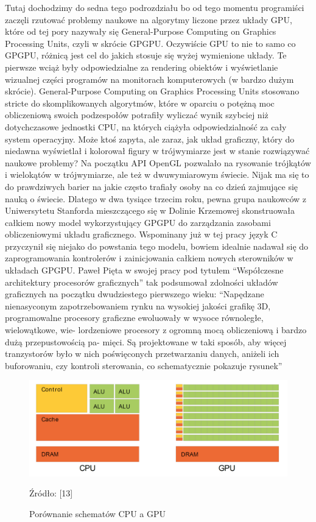 \documentclass{article}
\begin{document}
	\par
	Tutaj dochodzimy do sedna tego podrozdziału bo od tego momentu programiści zaczęli rzutować problemy naukowe na algorytmy liczone przez układy GPU, które od tej pory nazywały się General-Purpose Computing on Graphics Processing Units, czyli w skrócie GPGPU. Oczywiście GPU to nie to samo co GPGPU, różnicą jest cel do jakich stosuje się wyżej wymienione układy. Te pierwsze wciąż były odpowiedzialne za rendering obiektów i wyświetlanie wizualnej części programów na monitorach komputerowych (w bardzo dużym skrócie). General-Purpose Computing on Graphics Processing Units stosowano stricte do skomplikowanych algorytmów, które w oparciu o potężną moc obliczeniową swoich podzespołów potrafiły wyliczać wynik szybciej niż dotychczasowe jednostki CPU, na których ciążyła odpowiedzialność za cały system operacyjny. Może ktoś zapyta, ale zaraz, jak układ graficzny, który do niedawna wyświetlał i kolorował figury w trójwymiarze jest w stanie rozwiązywać naukowe problemy? Na początku API OpenGL pozwalało na rysowanie \linebreak trójkątów i wielokątów w trójwymiarze, ale też w dwuwymiarowym świecie. Nijak ma się to do prawdziwych barier na jakie często trafiały osoby na co dzień zajmujące się nauką o świecie. Dlatego w dwa tysiące trzecim roku, pewna grupa naukowców z Uniwersytetu Stanforda mieszczącego się w Dolinie Krzemowej skonstruowała całkiem nowy model wykorzystujący GPGPU do zarządzania zasobami obliczeniowymi układu graficznego. Wspominany już w tej pracy język C przyczynił się niejako do powstania tego modelu, bowiem idealnie nadawał się do zaprogramowania kontrolerów i zainicjowania całkiem nowych sterowników w układach GPGPU. Paweł Pięta w swojej pracy pod tytułem “Współczesne architektury procesorów graficznych” tak podsumował zdolności układów graficznych na początku dwudziestego pierwszego wieku: “Napędzane nienasyconym zapotrzebowaniem rynku na wysokiej jakości grafikę 3D, programowalne procesory graficzne ewoluowały w wysoce równoległe, wielowątkowe, wie- lordzeniowe procesory z ogromną mocą obliczeniową i bardzo dużą przepustowością pa- mięci. Są projektowane w taki sposób, aby więcej tranzystorów było w nich poświęconych przetwarzaniu danych, aniżeli ich buforowaniu, czy kontroli sterowania, co schematycznie pokazuje rysunek”
	\begin{figure}
		\centering
		\includegraphics[width=15cm]{simd}
		\caption{Porównanie schematów CPU a GPU}
		Źródło: [13]
	\end{figure}
\end{document}
